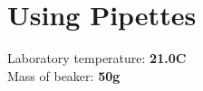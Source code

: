 \documentclass[a4paper,10pt]{article}
\begin{document}



\section{Using Pipettes}

Laboratory temperature: \textbf{21.0\degree C}\\
Mass of beaker: \textbf{50g}
\end{document}
